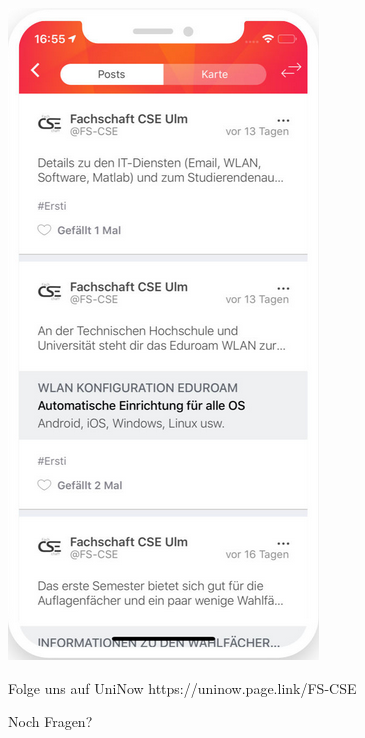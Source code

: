 \documentclass[10pt,a4paper]{beamer}
\begin{document}
\begin{frame}
\begin{center}
            \includegraphics[height=0.7\textheight]{uninow2.png}
        \end{center}
        \begin{block}{Folge uns auf UniNow}
            https://uninow.page.link/FS-CSE
        \end{block}
    \end{frame}

    \begin{frame}
        \begin{center}
            \Huge{Noch Fragen?}
        \end{center}
    \end{frame}
\end{document}
